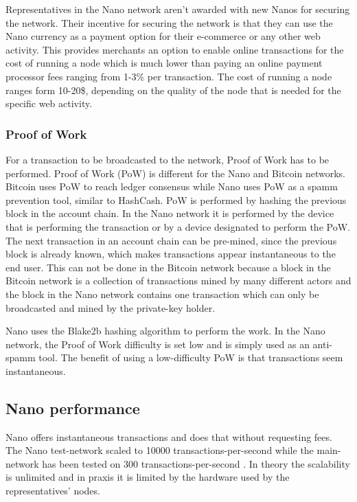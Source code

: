 \documentclass{ferseminar}
\begin{document}
Representatives in the Nano network aren't awarded with new Nanos for securing the network. Their incentive for securing the network is that they can use the Nano currency as a payment option for their e-commerce or any other web activity. This provides merchants an option to enable online transactions for the cost of running a node which is much lower than paying an online payment processor fees ranging from 1-3\% per transaction. The cost of running a node ranges form 10-20\$, depending on the quality of the node that is needed for the specific web activity.

\subsubsection{Proof of Work}

For a transaction to be broadcasted to the network, Proof of Work has to be performed. Proof of Work (PoW) is different for the Nano and Bitcoin networks. Bitcoin uses PoW to reach ledger consensus while Nano uses PoW as a spamm prevention tool, similar to HashCash. PoW is performed by hashing the previous block in the account chain. In the Nano network it is performed by the device that is performing the transaction or by a device designated to perform the PoW. The next transaction in an account chain can be pre-mined, since the previous block is already known, which makes transactions appear instantaneous to the end user. This can not be done in the Bitcoin network because a block in the Bitcoin network is a collection of transactions mined by many different actors and the block in the Nano network contains one transaction which can only be broadcasted and mined by the private-key holder.

Nano uses the Blake2b hashing algorithm to perform the work. In the Nano network, the Proof of Work difficulty is set low and is simply used as an anti-spamm tool. The benefit of using a low-difficulty PoW is that transactions seem instantaneous.


\subsection{Nano performance}
Nano offers instantaneous transactions and does that without requesting fees. The Nano test-network scaled to 10000 transactions-per-second while the main-network has been tested on 300 transactions-per-second \cite{Stress}. In theory the scalability is unlimited and in praxis it is limited by the hardware used by the representatives' nodes.
\end{document}
